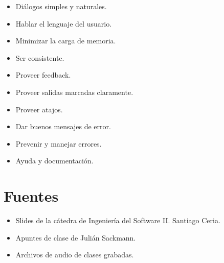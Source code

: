 \documentclass[]{article}
\begin{document}
\begin{itemize}
    \item Diálogos simples y naturales.
    \item Hablar el lenguaje del usuario.
    \item Minimizar la carga de memoria.
    \item Ser consistente.
    \item Proveer feedback.
    \item Proveer salidas marcadas claramente.
    \item Proveer atajos.
    \item Dar buenos mensajes de error.
    \item Prevenir y manejar errores.
    \item Ayuda y documentación.
\end{itemize}









\newpage
\section{Fuentes}
\begin{itemize}
	\item Slides de la cátedra de Ingeniería del Software II. Santiago Ceria.
	\item Apuntes de clase de Julián Sackmann.
	\item Archivos de audio de clases grabadas.
\end{itemize}
\end{document}
